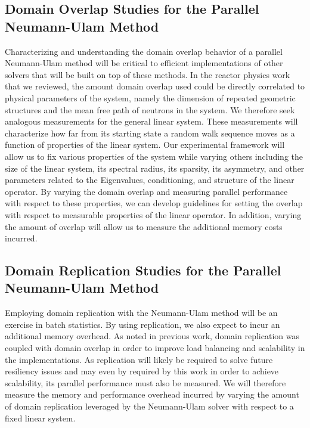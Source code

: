 \subsection{Domain Overlap Studies for the Parallel Neumann-Ulam
  Method}
\label{subsec:domain_overlap_studies}
Characterizing and understanding the domain overlap behavior of a
parallel Neumann-Ulam method will be critical to efficient
implementations of other solvers that will be built on top of these
methods. In the reactor physics work that we reviewed, the amount
domain overlap used could be directly correlated to physical
parameters of the system, namely the dimension of repeated geometric
structures and the mean free path of neutrons in the system. We
therefore seek analogous measurements for the general linear
system. These measurements will characterize how far from its starting
state a random walk sequence moves as a function of properties of the
linear system. Our experimental framework will allow us to fix various
properties of the system while varying others including the size of
the linear system, its spectral radius, its sparsity, its asymmetry,
and other parameters related to the Eigenvalues, conditioning, and
structure of the linear operator. By varying the domain overlap and
measuring parallel performance with respect to these properties, we
can develop guidelines for setting the overlap with respect to
measurable properties of the linear operator. In addition, varying the
amount of overlap will allow us to measure the additional memory costs
incurred.

\subsection{Domain Replication Studies for the Parallel Neumann-Ulam
  Method}
\label{subsec:domain_replication_studies}
Employing domain replication with the Neumann-Ulam method will be an
exercise in batch statistics. By using replication, we also expect to
incur an additional memory overhead. As noted in previous work, domain
replication was coupled with domain overlap in order to improve load
balancing and scalability in the implementations. As replication will
likely be required to solve future resiliency issues and may even by
required by this work in order to achieve scalability, its parallel
performance must also be measured. We will therefore measure the
memory and performance overhead incurred by varying the amount of
domain replication leveraged by the Neumann-Ulam solver with respect
to a fixed linear system.

